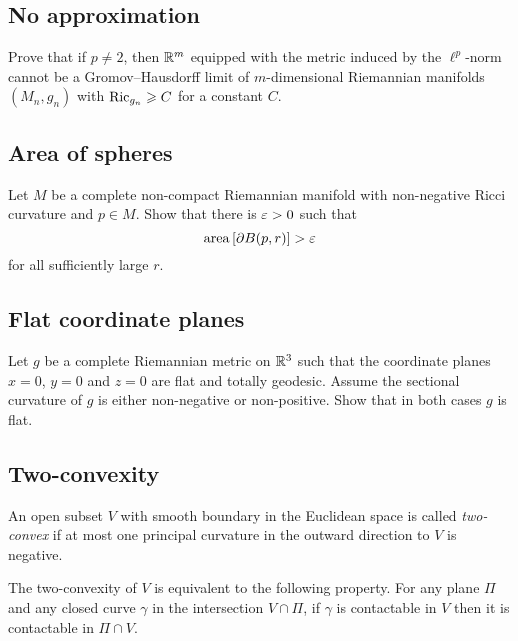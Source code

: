 \subsection*{No approximation\many}
\label{No approximation}

\begin{pr}
Prove that 
if $p\not=2$,
then $\mathbb{R}^m$ 
equipped with the metric induced by the $\ell^p$-norm 
cannot be a
Gromov--Hausdorff limit of
$m$-dimensional Riemannian manifolds $(M_n,g_n)$ with $\Ric_{g_n}\z\ge C$ for a constant $C$.
\end{pr}

\subsection*{Area of spheres}
\label{Area of spheres}

\begin{pr}
Let $M$ be a complete non-compact Riemannian manifold 
with non-negative Ricci curvature and $p\in M$.
Show that there is $\varepsilon>0$ such that 
$$\operatorname{\rm area}\nolimits\left[\partial B(p,r)\right]>\varepsilon$$
for all sufficiently large $r$.
\end{pr}

\subsection*{Flat coordinate planes}
\label{Flat coordinate planes}

\begin{pr}
Let $g$ be a complete Riemannian metric on $\mathbb{R}^3$ such that the coordinate planes $x=0$, $y=0$ and $z=0$ are flat and totally geodesic.
Assume the sectional curvature of $g$ is either non-negative or non-positive.
Show that in both cases $g$ is flat. 
\end{pr}

\subsection*{Two-convexity\many}
\label{Two-convexity}

An open subset $V$ with smooth boundary in the Euclidean space  
is called \emph{two-convex} if at most one principal curvature in the outward direction to $V$ is negative.

The two-convexity of $V$ is equivalent to the following property.
For any plane $\Pi$ and any closed curve $\gamma$ in the intersection  $V\cap \Pi$,
if $\gamma$ is contactable in $V$ then it is contactable in $\Pi\cap V$.

